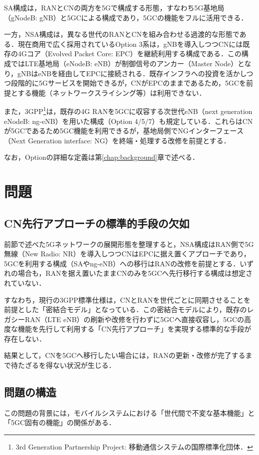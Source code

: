 SA構成は，RANとCNの両方を5Gで構成する形態，すなわち5G基地局（gNodeB: gNB）と5GCによる構成であり，5GCの機能をフルに活用できる\cite{NTTDocomo_5GSA_2023}．

一方，NSA構成は，異なる世代のRANとCNを組み合わせる過渡的な形態である．現在商用で広く採用されているOption 3系は，gNBを導入しつつCNには既存の4Gコア（Evolved Packet Core: EPC）を継続利用する構成である\cite{NGMN_5GDevices_SAMigration}．この構成ではLTE基地局（eNodeB: eNB）が制御信号のアンカー（Master Node）となり，gNBはeNBを経由してEPCに接続される．既存インフラへの投資を活かしつつ段階的に5Gサービスを開始できるが\cite{MIC_Whitepaper_R02}，CNがEPCのままであるため，5GCを前提とする機能（ネットワークスライシング\cite{3GPP_TS23501_R15}等）は利用できない\cite{GSMA_5GNSA_Option3}．

また，3GPP\footnote{3rd Generation Partnership Project: 移動通信システムの国際標準化団体．}は，既存の4G RANを5GCに収容する次世代eNB（next generation eNodeB: ng-eNB）\cite{3GPP_TS38300}を用いた構成（Option 4/5/7）も規定している\cite{3GPP_TR38801}．これらはCNが5GCであるため5GC機能を利用できるが，基地局側でNGインターフェース（Next Generation interface: NG）を終端・処理する改修を前提とする\cite{3GPP_TS38300,3GPP_TS38413}．

なお，Optionの詳細な定義は第\ref{chap:background}章で述べる．

\section{問題}

\subsection{CN先行アプローチの標準的手段の欠如}
前節で述べた5Gネットワークの展開形態を整理すると，NSA構成はRAN側で5G無線（New Radio: NR）を導入しつつCNはEPCに据え置くアプローチであり，5GCを利用する構成（SAやng-eNB）への移行はRANの改修を前提とする．いずれの場合も，RANを据え置いたままCNのみを5GCへ先行移行する構成は想定されていない．

すなわち，現行の3GPP標準仕様は，CNとRANを世代ごとに同期させることを前提とした「密結合モデル」となっている．この密結合モデルにより，既存のレガシーRAN（LTE eNB）の刷新や改修を行わずに5GCへ直接収容し，5GCの高度な機能を先行して利用する「CN先行アプローチ」を実現する標準的な手段が存在しない．

結果として，CNを5GCへ移行したい場合には，RANの更新・改修が完了するまで待たざるを得ない状況が生じる．

\subsection{問題の構造}
この問題の背景には，モバイルシステムにおける「世代間で不変な基本機能」と「5GC固有の機能」の関係がある．

